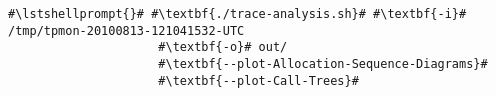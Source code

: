 \begin{lstlisting}[caption=Command to produce the diagrams under \UnixLikeSystems,label=lst:traceAnalysis:sequenceDiagram]
#\lstshellprompt{}# #\textbf{./trace-analysis.sh}# #\textbf{-i}# /tmp/tpmon-20100813-121041532-UTC
                     #\textbf{-o}# out/
                     #\textbf{--plot-Allocation-Sequence-Diagrams}#
                     #\textbf{--plot-Call-Trees}#							 
\end{lstlisting}
